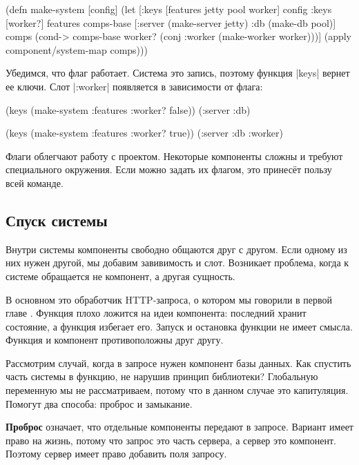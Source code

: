 \begin{english}
  \begin{clojure}
(defn make-system [config]
  (let [{:keys [features jetty pool worker]} config
        {:keys [worker?]} features
        comps-base [:server (make-server jetty)
                    :db (make-db pool)]
        comps (cond-> comps-base
                worker?
                (conj :worker (make-worker worker)))]
    (apply component/system-map comps)))
  \end{clojure}
\end{english}

Убедимся, что флаг работает. Система это запись, поэтому функция \spverb|keys|
вернет ее ключи. Слот \spverb|:worker| появляется в зависимости от флага:

\begin{english}
  \begin{clojure}
(keys (make-system {:features {:worker? false}}))
(:server :db)

(keys (make-system {:features {:worker? true}}))
(:server :db :worker)
  \end{clojure}
\end{english}

Флаги облегчают работу с проектом. Некоторые компоненты сложны и требуют
специального окружения. Если можно задать их флагом, это принес\"{е}т пользу
всей команде.

\subsection{Спуск системы}

Внутри системы компоненты свободно общаются друг с другом. Если одному из них
нужен другой, мы добавим завивимость и слот. Возникает проблема, когда к системе
обращается не компонент, а другая сущность.

В основном это обработчик HTTP-запроса, о котором мы говорили в первой
главе . Функция плохо ложится на идеи компонента: последний
хранит состояние, а функция избегает его. Запуск и остановка функции не имеет
смысла. Функция и компонент противоположны друг другу.

Рассмотрим случай, когда в запросе нужен компонент базы данных. Как спустить
часть системы в функцию, не нарушив принцип библиотеки? Глобальную переменную мы
не рассматриваем, потому что в данном случае это капитуляция. Помогут два
способа: проброс и замыкание.

\textbf{Проброс} означает, что отдельные компоненты передают в запросе. Вариант
имеет право на жизнь, потому что запрос это часть сервера, а сервер это
компонент. Поэтому сервер имеет право добавить поля запросу.

